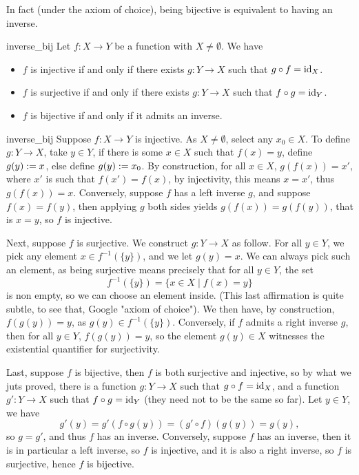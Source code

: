 In fact (under the axiom of choice), being bijective is equivalent to having an inverse.
\begin{cprop}{}{inverse_bij}
    Let \( f : X \to Y \) be a function with \( X \neq \emptyset \). We have
    \begin{itemize}
        \item \( f \) is injective if and only if there exists \( g : Y \to X \) such that \( g \circ f = \mathrm{id}_X \). 
        \item \( f \) is surjective if and only if there exists \( g : Y \to X \) such that \( f \circ g = \mathrm{id}_Y \).
        \item \( f \) is bijective if and only if it admits an inverse. 
    \end{itemize}
\end{cprop}
\begin{propproof}{inverse_bij}
    Suppose \( f : X \to Y \) is injective. As \( X \neq \emptyset \), select any \( x_0 \in X \). To define \( g : Y \to X \), take \( y \in Y \), if there is some \( x \in X \) such that \( f(x) = y \), define \( g(y) := x \), else define \( g(y) := x_0 \). By construction, for all \( x \in X \), \( g(f(x)) = x' \), where \( x' \) is such that \( f(x') = f(x) \), by injectivity, this means \( x = x' \), thus \( g(f(x)) = x \). Conversely, suppose \( f \) has a left inverse \( g \), and suppose \( f(x) = f(y) \), then applying \( g \) both sides yields \( g(f(x)) = g(f(y)) \), that is \( x = y \), so \( f \) is injective.

    Next, suppose \( f \) is surjective. We construct \( g : Y \to X \) as follow. For all \( y \in Y \), we pick any element \( x \in f^{-1}(\{ y \}) \), and we let \( g(y) = x \). We can always pick such an element, as being surjective means precisely that for all \( y \in Y\), the set
    \begin{equation*}
        f^{-1}(\{ y \}) = \{ x \in X \mid f(x) = y \}
    \end{equation*}
    is non empty, so we can choose an element inside. (This last affirmation is quite subtle, to see that, Google "axiom of choice"). We then have, by construction, \( f(g(y)) = y \), as \( g(y) \in f^{-1}(\{ y \}) \). Conversely, if \( f \) admits a right inverse \( g \), then for all \( y \in Y \), \( f(g(y)) = y \), so the element \( g(y) \in X \) witnesses the existential quantifier for surjectivity.

    Last, suppose \( f \) is bijective, then \( f \) is both surjective and injective, so by what we juts proved, there is a function \( g : Y \to X \) such that \( g \circ f = \mathrm{id}_X \), and a function \( g' : Y \to X \) such that \( f \circ g = \mathrm{id}_Y \) (they need not to be the same so far). Let \( y \in Y \), we have
    \begin{equation*}
        g'(y) = g'(f\circ g(y)) = (g' \circ f) (g(y)) = g(y),
    \end{equation*}
    so \( g = g' \), and thus \( f \) has an inverse. Conversely, suppose \( f \) has an inverse, then it is in particular a left inverse, so \( f \) is injective, and it is also a right inverse, so \( f \) is surjective, hence \( f \) is bijective.
\end{propproof}

